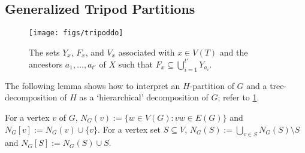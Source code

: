 
\subsection{Generalized Tripod Partitions}


 \begin{figure}[htbp]
   \begin{center}
     \texttt{[image: figs/tripoddo]}
   \end{center}
   \caption{The sets $Y_x$, $F_x$, and $V_x$ associated with $x\in V(T)$
   and the ancestors $a_1,\ldots,a_{t'}$ of $X$ such that $F_x \subseteq \bigcup_{i=1}^{t'} Y_{a_i}$.}
   \label{fig:generalized-tripod}
 \end{figure}

 The following lemma shows how to interpret an $H$-partition of $G$ and a tree-decomposition of $H$ as a `hierarchical' decomposition of $G$; refer to \cref{fig:generalized-tripod}.

 For a vertex $v$ of $G$, $N_G(v):=\{w\in V(G):vw\in E(G)\}$ and $N_G[v]:=N_G(v)\cup\{v\}$.  For a vertex set $S\subseteq V$, $N_G(S):=\bigcup_{v\in S} N_G(S)\setminus S$ and $N_G[S]:=N_G(S)\cup S$.


